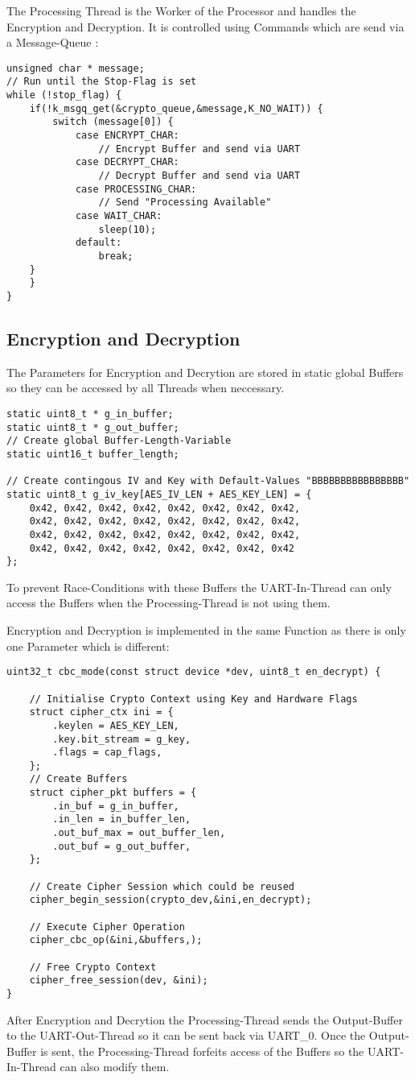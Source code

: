 The Processing Thread is the Worker of the Processor and handles the
Encryption and Decryption.
It is controlled using Commands which are send via a Message-Queue :

\begin{lstlisting}[style=CStyle,caption=Processing Thread Pseudo-Code]
unsigned char * message;
// Run until the Stop-Flag is set
while (!stop_flag) {
	if(!k_msgq_get(&crypto_queue,&message,K_NO_WAIT)) {
		switch (message[0]) {
			case ENCRYPT_CHAR:
				// Encrypt Buffer and send via UART
			case DECRYPT_CHAR:
				// Decrypt Buffer and send via UART
			case PROCESSING_CHAR:
				// Send "Processing Available"
			case WAIT_CHAR:
				sleep(10);
			default:
				break;
	}
	}
}
\end{lstlisting}

\subsection{Encryption and Decryption}

The Parameters for Encryption and Decrytion are stored in static global
Buffers so they can be accessed by all Threads when neccessary.

\begin{lstlisting}[style=CStyle,caption=Global Buffers for Encryption and Decryption]
static uint8_t * g_in_buffer;
static uint8_t * g_out_buffer;
// Create global Buffer-Length-Variable
static uint16_t buffer_length;

// Create contingous IV and Key with Default-Values "BBBBBBBBBBBBBBBB"
static uint8_t g_iv_key[AES_IV_LEN + AES_KEY_LEN] = {
    0x42, 0x42, 0x42, 0x42, 0x42, 0x42, 0x42, 0x42,
	0x42, 0x42, 0x42, 0x42, 0x42, 0x42, 0x42, 0x42,
    0x42, 0x42, 0x42, 0x42, 0x42, 0x42, 0x42, 0x42,
	0x42, 0x42, 0x42, 0x42, 0x42, 0x42, 0x42, 0x42
};
\end{lstlisting}


To prevent Race-Conditions with these Buffers the UART-In-Thread can only
access the Buffers when the Processing-Thread is not using them.

\pagebreak

Encryption and Decryption is implemented in the same Function as there
is only one Parameter which is different:

\begin{lstlisting}[style=CStyle,caption=Encryption and Decryption Pseudo-Code]
uint32_t cbc_mode(const struct device *dev, uint8_t en_decrypt) {

	// Initialise Crypto Context using Key and Hardware Flags
	struct cipher_ctx ini = {
		.keylen = AES_KEY_LEN,
		.key.bit_stream = g_key,
		.flags = cap_flags,
	};
	// Create Buffers
	struct cipher_pkt buffers = {
		.in_buf = g_in_buffer,
		.in_len = in_buffer_len,
		.out_buf_max = out_buffer_len,
		.out_buf = g_out_buffer,
	};

	// Create Cipher Session which could be reused
	cipher_begin_session(crypto_dev,&ini,en_decrypt);

	// Execute Cipher Operation
	cipher_cbc_op(&ini,&buffers,);

	// Free Crypto Context
	cipher_free_session(dev, &ini);
}
\end{lstlisting}

After Encryption and Decrytion the Processing-Thread sends the Output-Buffer
to the UART-Out-Thread so it can be sent back via UART\_0.
Once the Output-Buffer is sent, the Processing-Thread forfeits access of
the Buffers so the UART-In-Thread can also modify them.
